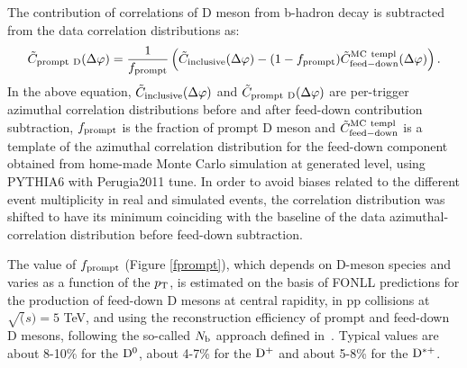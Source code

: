 
The contribution of correlations of D meson from b-hadron decay is subtracted from the data correlation distributions as:
\begin{equation}
\tilde{C}_{\rm prompt~D}(\Delta\varphi)=\frac{1}{f_{\rm prompt}}\left(\tilde{C}_{\rm inclusive}(\Delta\varphi)-(1-f_{\rm prompt})\tilde{C}_{\rm feed-down}^{\rm MC~templ}(\Delta\varphi) \right).
\label{eqFeedDown}
\end{equation}
In the above equation, $\tilde{C}_{\rm inclusive}(\Delta\varphi)$ and $\tilde{C}_{\rm prompt~D}(\Delta\varphi)$ are per-trigger azimuthal correlation distributions before and after
feed-down contribution subtraction, $f_{\rm prompt}$ is the fraction of prompt D meson and $\tilde{C}_{\rm feed-down}^{\rm MC~templ}$ is a template
of the azimuthal correlation distribution for the feed-down component obtained from home-made Monte Carlo simulation at generated level, using PYTHIA6 with Perugia2011 tune.
In order to avoid biases related to the different event multiplicity in real and simulated events, the correlation distribution was shifted to have its minimum coinciding with the baseline of the data azimuthal-correlation distribution before feed-down subtraction. %

The value of $f_{\rm prompt}$ (Figure \ref{fprompt}), which depends on D-meson species and varies as a function of the $p_{\rm T}$, is estimated on the basis of FONLL predictions for the production of feed-down D mesons at central rapidity, in pp collisions at $\sqrt(s) = 5$ TeV, and using the reconstruction efficiency of prompt and feed-down D mesons, following the so-called $N_{\rm b}$ approach defined in~\cite{ALICEDmespp7Tev}. Typical values are about 8-10\% for the
${\rm D^0}$, about 4-7\% for the ${\rm D^+}$ and about 5-8\% for the ${\rm D^{*+}}$. %

